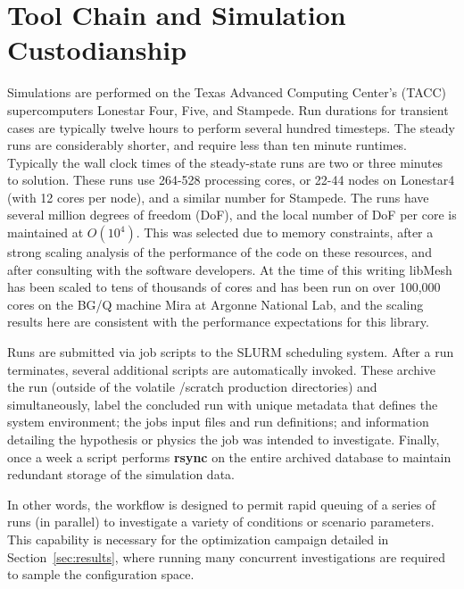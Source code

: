 \section{Tool Chain and Simulation Custodianship}

Simulations are performed on the Texas Advanced Computing Center's 
(TACC) supercomputers Lonestar Four, Five, and Stampede. Run
durations for transient cases are typically twelve hours to perform
several hundred timesteps.  The steady runs are considerably shorter,
and require less than ten minute runtimes. Typically  the wall clock
times of the steady-state runs are two or three minutes to solution. 
These runs use 264-528 processing cores, or 22-44 nodes on Lonestar4
(with 12 cores per node), and a similar number for Stampede. The runs have 
several million degrees of freedom (DoF), and the local number of DoF
per core is maintained at $O(10^4)$. This was selected due to memory
constraints, after a strong scaling analysis of the performance of the
code on these resources, and after consulting with the software developers.  
At the time of this writing libMesh has been scaled to tens of thousands of
cores and has been run on over 100,000 cores on the BG/Q machine Mira at
Argonne National Lab\cite{gaston2013massive}, and the scaling results
here are consistent with the performance expectations for this library.


Runs are submitted via job scripts to the SLURM\cite{yoo2003slurm}
scheduling system. After a run terminates, several additional scripts
are automatically invoked.  
These archive the run (outside of the volatile /scratch 
production directories) and simultaneously, label the concluded run with
unique metadata that defines the system environment; the jobs input
files and run definitions; and information detailing the
hypothesis or physics the job was intended to investigate. Finally, once 
a week a script performs \textbf{rsync} on the entire archived database to
maintain redundant storage of the simulation data. 

In other words, the workflow is designed to permit rapid queuing of a
series of runs (in parallel) to investigate a variety of conditions or
scenario parameters. This capability is necessary for the optimization
campaign detailed in Section~\ref{sec:results}, where running many
concurrent investigations are required to sample the configuration
space.  



